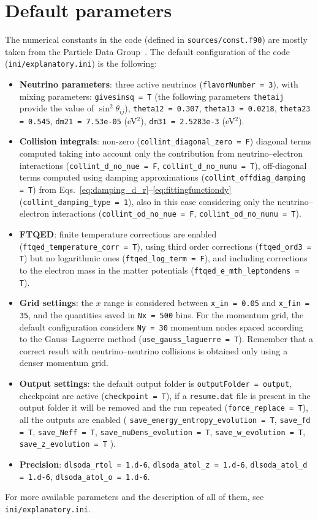 \documentclass[notitlepage,nofootinbib,showpacs,preprintnumbers,amsmath,amssymb,superscriptaddress,prd,onecolumn]{revtex4-1}
\begin{document}
\section{Default parameters}
\label{ssec:default}
The numerical constants in the code (defined in \texttt{sources/const.f90})
are mostly taken from the Particle Data Group~\cite{Tanabashi:2018oca,Zyla:2020zbs}.
The default configuration of the code (\texttt{ini/explanatory.ini}) is the following:
\begin{itemize}
\item
\textbf{Neutrino parameters}: three active neutrinos (\texttt{flavorNumber = 3}), with mixing parameters:
\texttt{givesinsq = T} (the following parameters \texttt{thetaij} provide the value of $\sin^2\theta_{ij}$),
\texttt{theta12 = 0.307},
\texttt{theta13 = 0.0218},
\texttt{theta23 = 0.545},
\texttt{dm21 = 7.53e-05} (eV$^2$),
\texttt{dm31 = 2.5283e-3} (eV$^2$).
%
\item
\textbf{Collision integrals}: non-zero (\texttt{collint\_diagonal\_zero = F}) diagonal terms
computed taking into account only the contribution from neutrino--electron interactions
(\texttt{collint\_d\_no\_nue = F}, \texttt{collint\_d\_no\_nunu = T}),
off-diagonal terms computed using damping approximations
(\texttt{collint\_offdiag\_damping = T})
from Eqs.~\eqref{eq:damping_d_r}--\eqref{eq:fittingfunctiondy} (\texttt{collint\_damping\_type = 1}),
also in this case considering only the neutrino--electron interactions
(\texttt{collint\_od\_no\_nue = F}, \texttt{collint\_od\_no\_nunu = T}).
%
\item
\textbf{FTQED}:
finite temperature corrections are enabled
(\texttt{ftqed\_temperature\_corr = T}),
using third order corrections (\texttt{ftqed\_ord3 = T})
but no logarithmic ones (\texttt{ftqed\_log\_term = F}),
and including corrections to the electron mass in the matter potentials
(\texttt{ftqed\_e\_mth\_leptondens = T}).
%
\item
\textbf{Grid settings}:
the $x$ range is considered between
\texttt{x\_in = 0.05} and
\texttt{x\_fin = 35},
and the quantities saved in \texttt{Nx = 500} bins.
For the momentum grid, the default configuration considers \texttt{Ny = 30} momentum nodes
spaced according to the Gauss--Laguerre method (\texttt{use\_gauss\_laguerre = T}).
Remember that a correct result with neutrino--neutrino collisions is obtained only using a denser momentum grid.
%
\item
\textbf{Output settings}:
the default output folder is \texttt{outputFolder = output},
checkpoint are active (\texttt{checkpoint = T}),
if a \texttt{resume.dat} file is present in the output folder it will be removed and the run repeated
(\texttt{force\_replace = T}),
all the outputs are enabled (%
\texttt{save\_energy\_entropy\_evolution = T},
\texttt{save\_fd = T},
\texttt{save\_Neff = T},
\texttt{save\_nuDens\_evolution = T},
\texttt{save\_w\_evolution = T},
\texttt{save\_z\_evolution = T}%
).
%
\item \textbf{Precision}:
\texttt{dlsoda\_rtol = 1.d-6},
\texttt{dlsoda\_atol\_z = 1.d-6},
\texttt{dlsoda\_atol\_d = 1.d-6},
\texttt{dlsoda\_atol\_o = 1.d-6}.
\end{itemize}
For more available parameters and the description of all of them, see \texttt{ini/explanatory.ini}.
\end{document}
